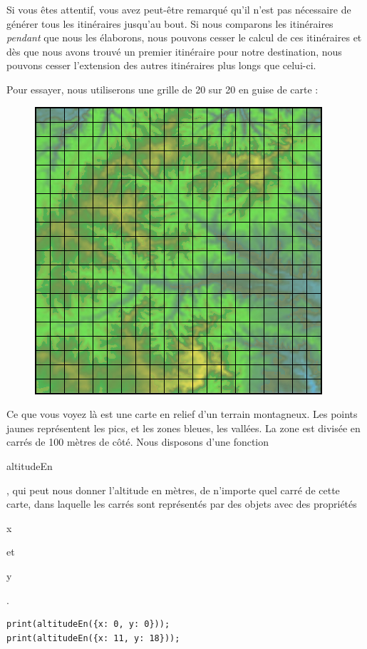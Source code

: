 \documentclass{FramateX}
\renewcommand{\texttt}[1]{\begin{sffamily}{#1}\end{sffamily}}
\begin{document}
Si vous êtes attentif, vous avez peut-être remarqué qu'il n'est pas
nécessaire de générer tous les itinéraires jusqu'au bout. Si nous
comparons les itinéraires \emph{pendant} que nous les élaborons, nous
pouvons cesser le calcul de ces itinéraires et dès que nous avons trouvé
un premier itinéraire pour notre destination, nous pouvons cesser
l'extension des autres itinéraires plus longs que celui-ci.

\begin{center}\end{center}

Pour essayer, nous utiliserons une grille de 20 sur 20 en guise de carte
:

\begin{figure}[ht!]
\centering
\includegraphics{img/height.png}
\caption{}
\end{figure}

Ce que vous voyez là est une carte en relief d'un terrain montagneux.
Les points jaunes représentent les pics, et les zones bleues, les
vallées. La zone est divisée en carrés de 100 mètres de côté. Nous
disposons d'une fonction \texttt{altitudeEn}, qui peut nous donner
l'altitude en mètres, de n'importe quel carré de cette carte, dans
laquelle les carrés sont représentés par des objets avec des propriétés
\texttt{x} et \texttt{y}.

\begin{lstlisting}
print(altitudeEn({x: 0, y: 0}));
print(altitudeEn({x: 11, y: 18}));
\end{lstlisting}
\begin{center}\end{center}
\end{document}
